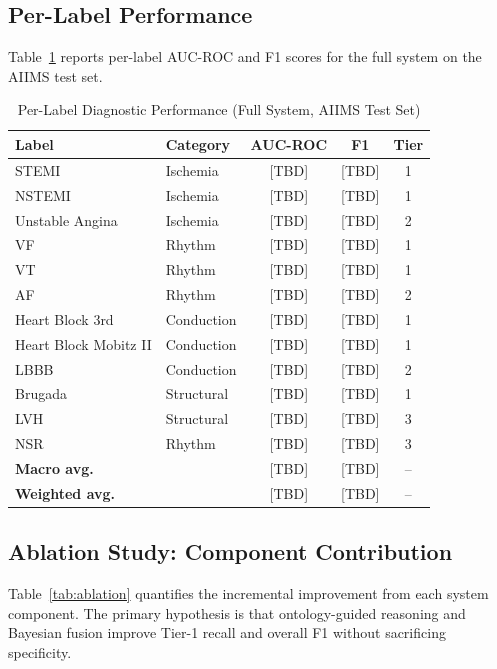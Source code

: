 \documentclass[journal]{IEEEtran}
\begin{document}
\subsection{Per-Label Performance}

Table~\ref{tab:perlabel} reports per-label AUC-ROC and F1 scores
for the full system on the AIIMS test set.

\begin{table}[!t]
\centering
\caption{Per-Label Diagnostic Performance (Full System, AIIMS Test Set)}
\label{tab:perlabel}
\setlength{\tabcolsep}{3pt}
\begin{tabular}{@{}llccc@{}}
  \toprule
  Label & Category & AUC-ROC & F1 & Tier \\
  \midrule
  STEMI               & Ischemia   & [TBD] & [TBD] & 1 \\
  NSTEMI              & Ischemia   & [TBD] & [TBD] & 1 \\
  Unstable Angina     & Ischemia   & [TBD] & [TBD] & 2 \\
  VF                  & Rhythm     & [TBD] & [TBD] & 1 \\
  VT                  & Rhythm     & [TBD] & [TBD] & 1 \\
  AF                  & Rhythm     & [TBD] & [TBD] & 2 \\
  Heart Block 3rd     & Conduction & [TBD] & [TBD] & 1 \\
  Heart Block Mobitz II & Conduction & [TBD] & [TBD] & 1 \\
  LBBB                & Conduction & [TBD] & [TBD] & 2 \\
  Brugada             & Structural & [TBD] & [TBD] & 1 \\
  LVH                 & Structural & [TBD] & [TBD] & 3 \\
  NSR                 & Rhythm     & [TBD] & [TBD] & 3 \\
  \midrule
  \textbf{Macro avg.}  &           & [TBD] & [TBD] & -- \\
  \textbf{Weighted avg.}&          & [TBD] & [TBD] & -- \\
  \bottomrule
\end{tabular}
\end{table}

\subsection{Ablation Study: Component Contribution}

Table~\ref{tab:ablation} quantifies the incremental improvement
from each system component.
The primary hypothesis is that ontology-guided reasoning and
Bayesian fusion improve Tier-1 recall and overall F1 without
sacrificing specificity.
\end{document}
